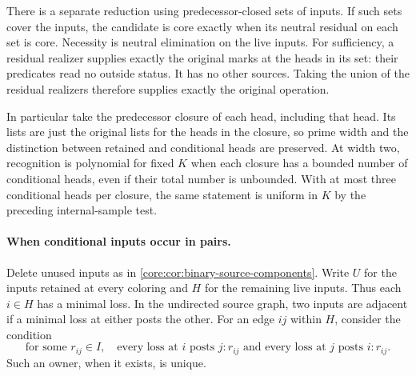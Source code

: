 There is a separate reduction using predecessor-closed
sets of inputs. If such sets cover the inputs, the
candidate is core exactly when its neutral residual
on each set is core. Necessity is neutral elimination
on the live inputs. For sufficiency, a residual
realizer supplies exactly the original marks at the
heads in its set: their predicates read no outside
status. It has no other sources. Taking the union
of the residual realizers therefore supplies exactly
the original operation.

In particular take the predecessor closure of each
head, including that head. Its lists are just the
original lists for the heads in the closure, so
prime width and the distinction between retained
and conditional heads are preserved. At width two,
recognition is polynomial for fixed $K$ when
each closure has a bounded number of conditional
heads, even if their total number is unbounded.
With at most three conditional heads per closure,
the same statement is uniform in $K$ by the
preceding internal-sample test.

\paragraph{When conditional inputs occur in pairs.}
Delete unused inputs as in \cref{core:cor:binary-source-components}.
Write $U$ for the inputs retained at every coloring and $H$ for the
remaining live inputs. Thus each $i\in H$ has a minimal loss. In the
undirected source graph, two inputs are adjacent if a minimal loss
at either posts the other. For an edge $ij$ within $H$, consider the
condition
\begin{equation}\label{core:eq:reciprocal-postings}
 \text{for some }r_{ij}\in I,\quad
 \text{every loss at $i$ posts $j:r_{ij}$ and every loss at $j$ posts
 $i:r_{ij}$.}
\end{equation}
Such an owner, when it exists, is unique.

